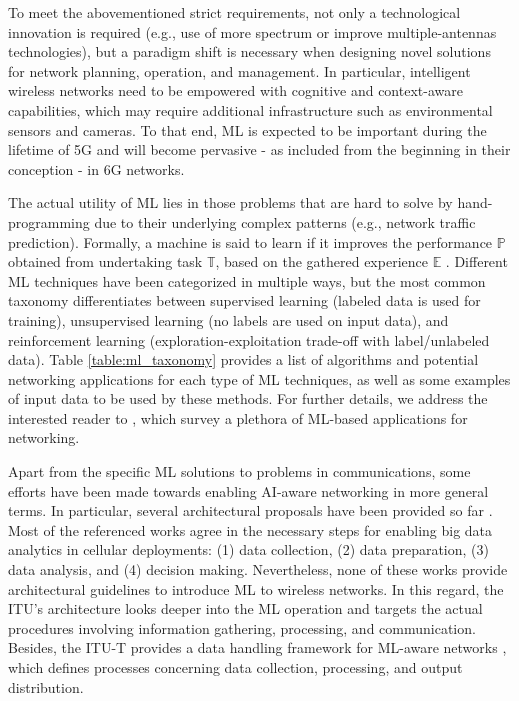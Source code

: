 \documentclass{article}
\begin{document}
To meet the abovementioned strict requirements, not only a technological innovation is required (e.g., use of more spectrum or improve multiple-antennas technologies), but a paradigm shift is necessary when designing novel solutions for network planning, operation, and management. In particular, intelligent wireless networks need to be empowered with cognitive and context-aware capabilities, which may require additional infrastructure such as environmental sensors and cameras. To that end, ML is expected to be important during the lifetime of 5G and will become pervasive - as included from the beginning in their conception - in 6G networks. 

The actual utility of ML lies in those problems that are hard to solve by hand-programming due to their underlying complex patterns (e.g., network traffic prediction). Formally, a machine is said to learn if it improves the performance $\mathbb{P}$ obtained from undertaking task $\mathbb{T}$, based on the gathered experience $\mathbb{E}$ \cite{mitchell1997machine}. Different ML techniques have been categorized in multiple ways, but the most common taxonomy differentiates between supervised learning (labeled data is used for training), unsupervised learning (no labels are used on input data), and reinforcement learning (exploration-exploitation trade-off with label/unlabeled data). Table \ref{table:ml_taxonomy} provides a list of algorithms and potential networking applications for each type of ML techniques, as well as some examples of input data to be used by these methods. For further details, we address the interested reader to \cite{jiang2016machine, zhang2019deep, usama2019unsupervised}, which survey a plethora of ML-based applications for networking.

Apart from the specific ML solutions to problems in communications, some efforts have been made towards enabling AI-aware networking in more general terms. In particular, several architectural proposals have been provided so far \cite{bi2015wireless,chih2017big,wang2018machine}. Most of the referenced works agree in the necessary steps for enabling big data analytics in cellular deployments: (1) data collection, (2) data preparation, (3) data analysis, and (4) decision making. Nevertheless, none of these works provide architectural guidelines to introduce ML to wireless networks. In this regard, the ITU's architecture looks deeper into the ML operation and targets the actual procedures involving information gathering, processing, and communication. Besides, the ITU-T provides a data handling framework for ML-aware networks \cite{itu2019data}, which defines processes concerning data collection, processing, and output distribution. 
\end{document}
